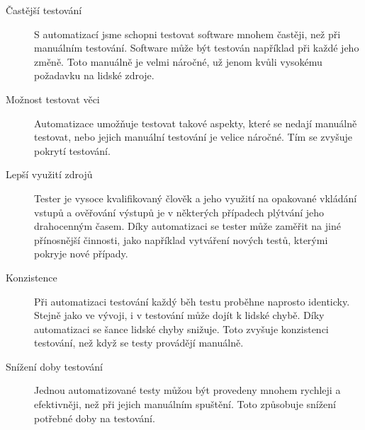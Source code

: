 \begin{description}
    \item[Častější testování] S automatizací jsme schopni testovat software mnohem častěji, než při manuálním testování. Software může být testován například při každé jeho změně. Toto manuálně je velmi náročné, už jenom kvůli vysokému požadavku na lidské zdroje.  
    \item[Možnost testovat  věci] Automatizace umožňuje testovat takové aspekty, které se nedají manuálně testovat, nebo jejich manuální testování je velice náročné. Tím se zvyšuje pokrytí testování.
    \item[Lepší využití zdrojů] Tester je vysoce kvalifikovaný člověk a jeho využití na opakované vkládání vstupů a ověřování výstupů je v některých případech plýtvání jeho drahocenným časem. Díky automatizaci se tester může zaměřit na jiné přínosnější činnosti, jako například vytváření nových testů, kterými pokryje nové případy.
    \item[Konzistence] Při automatizaci testování každý běh testu proběhne naprosto identicky. Stejně jako ve vývoji, i v testování může dojít k lidské chybě. Díky automatizaci se šance lidské chyby snižuje. Toto zvyšuje konzistenci testování, než když se testy provádějí manuálně.
    \item[Snížení doby testování] Jednou automatizované testy můžou být provedeny mnohem rychleji a efektivněji, než při jejich manuálním spuštění. Toto způsobuje snížení potřebné doby na testování.
\end{description}